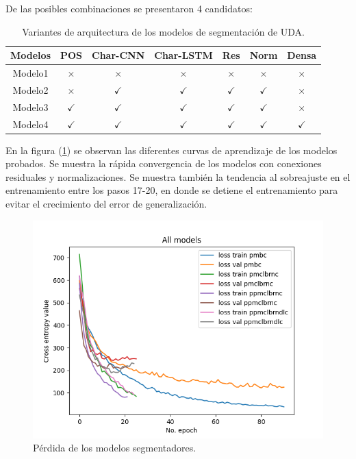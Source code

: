 De las posibles combinaciones se presentaron 4 candidatos:

\begin{table}[h!]
	\begin{center}
		\begin{tabular}{|c|c|c|c|c|c|c|} \hline
		Modelos 	& POS       & Char-CNN  & Char-LSTM & Res       & Norm      & Densa  \\ \hline
		Modelo1		& $\times$	& $\times$    & $\times$    & $\times$	& $\times$    & $\times$ \\ \hline
		Modelo2		& $\times$	& $\checkmark$    & $\checkmark$    & $\checkmark$	& $\checkmark$    & $\times$ \\ \hline
		Modelo3		& $\checkmark$	& $\checkmark$    & $\checkmark$    & $\checkmark$	& $\checkmark$    & $\times$ \\ \hline
		Modelo4		& $\checkmark$	& $\checkmark$    & $\checkmark$    & $\checkmark$	& $\checkmark$    & $\checkmark$ \\ \hline
		\end{tabular}
	\caption{Variantes de arquitectura de los modelos de segmentación de UDA.}\label{table:segmenter_architecture_table}
	\end{center}
\end{table}

En la figura (\ref{fig:segmenter_model_loss}) se observan las diferentes curvas de aprendizaje de los modelos 
probados. Se muestra la rápida convergencia de los modelos con conexiones residuales y normalizaciones.
Se muestra también la tendencia al sobreajuste en el entrenamiento entre los pasos 17-20, en donde se detiene el 
entrenamiento para evitar el crecimiento del error de generalización.

\begin{figure}[h!]
	\begin{center}
		\begin{center}
			\includegraphics[scale=.9]{Graphics/persuasive_essays_all_linked_crf_loss.png}
        \end{center}
	    \caption{Pérdida de los modelos segmentadores.}\label{fig:segmenter_model_loss}
	\end{center}
\end{figure}

